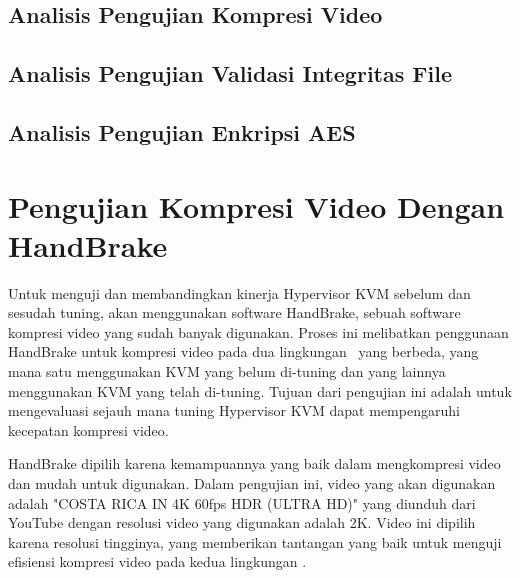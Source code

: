 \subsection{Analisis Pengujian Kompresi Video}

\subsection{Analisis Pengujian Validasi Integritas File}

\subsection{Analisis Pengujian Enkripsi AES}


\iffalse
    \section{Pengujian Kompresi Video Dengan HandBrake}
    Untuk menguji dan membandingkan kinerja Hypervisor KVM sebelum dan sesudah tuning, {\saya} akan menggunakan software HandBrake, sebuah software kompresi video yang sudah banyak digunakan. Proses ini melibatkan penggunaan HandBrake untuk kompresi video pada dua lingkungan \vm\ yang berbeda, yang mana satu menggunakan KVM yang belum di-tuning dan yang lainnya menggunakan KVM yang telah di-tuning. Tujuan dari pengujian ini adalah untuk mengevaluasi sejauh mana tuning Hypervisor KVM dapat mempengaruhi kecepatan kompresi video.

    HandBrake dipilih karena kemampuannya yang baik dalam mengkompresi video dan mudah untuk digunakan\cite{Folgar2014eg}. Dalam pengujian ini, video yang akan digunakan adalah "COSTA RICA IN 4K 60fps HDR (ULTRA HD)" yang diunduh dari YouTube dengan resolusi video yang digunakan adalah 2K. Video ini dipilih karena resolusi tingginya, yang memberikan tantangan yang baik untuk menguji efisiensi kompresi video pada kedua lingkungan \vm.

